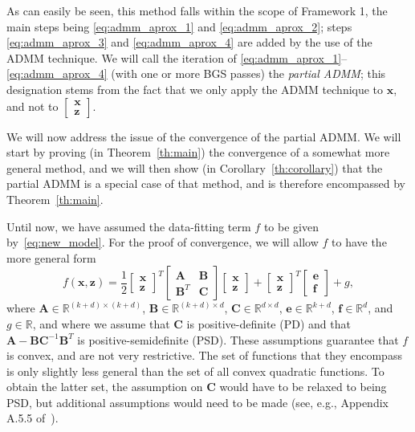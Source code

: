 \documentclass[10pt,twocolumn,twoside]{IEEEtran}
\newcommand{\x}{\mathbf{x}} %
\newcommand{\z}{\mathbf{z}} %
\newcommand{\A}{\mathbf{A}} %
\newcommand{\B}{\mathbf{B}} %
\newcommand{\C}{\mathbf{C}} %
\newcommand{\e}{\mathbf{e}} %
\newcommand{\f}{\mathbf{f}} %
\begin{document}
As can easily be seen, this method falls within the scope of Framework 1, the main steps being \eqref{eq:admm_aprox_1} and \eqref{eq:admm_aprox_2}; steps \eqref{eq:admm_aprox_3} and \eqref{eq:admm_aprox_4} are added by the use of the ADMM technique. We will call the iteration of \eqref{eq:admm_aprox_1}--\eqref{eq:admm_aprox_4} (with one or more BGS passes) the \textit{partial ADMM}; this designation stems from the fact that we only apply the ADMM technique to $\x$, and not to $\left[\begin{smallmatrix}\x\\ \z \end{smallmatrix}\right]$.

We will now address the issue of the convergence of the partial ADMM. We will start by proving (in Theorem~\ref{th:main}) the convergence of a somewhat more general method, and we will then show (in Corollary~\ref{th:corollary}) that the partial ADMM is a special case of that method, and is therefore encompassed by Theorem~\ref{th:main}.

Until now, we have assumed the data-fitting term $f$ to be given by~\eqref{eq:new_model}. For the proof of convergence, we will allow $f$ to have the more general form
\begin{equation} \label{eq:quadratic_f}
f(\x, \z) = \frac{1}{2} \begin{bmatrix} \x \\ \z \end{bmatrix}^T \begin{bmatrix} \A & \B \\ \B^T & \C \end{bmatrix} \begin{bmatrix} \x \\ \z \end{bmatrix} + \begin{bmatrix} \x \\ \z \end{bmatrix}^T \begin{bmatrix} \e \\ \f \end{bmatrix} + g,
\end{equation}
where $\A \in \mathbb{R}^{(k+d) \times (k+d)}$, $\B \in \mathbb{R}^{(k+d) \times d}$, $\C \in \mathbb{R}^{d \times d}$, $\e \in \mathbb{R}^{k+d}$, $\f \in \mathbb{R}^{d}$, and $g \in \mathbb{R}$, and where we assume that $\C$ is positive-definite (PD) and that $\A - \B \C^{-1} \B^T$ is positive-semidefinite (PSD). These assumptions guarantee that $f$ is convex, and are not very restrictive. The set of functions that they encompass is only slightly less general than the set of all convex quadratic functions. To obtain the latter set, the assumption on $\C$ would have to be relaxed to being PSD, but additional assumptions would need to be made (see, e.g., Appendix A.5.5 of~\cite{Boyd2004}).
\end{document}
